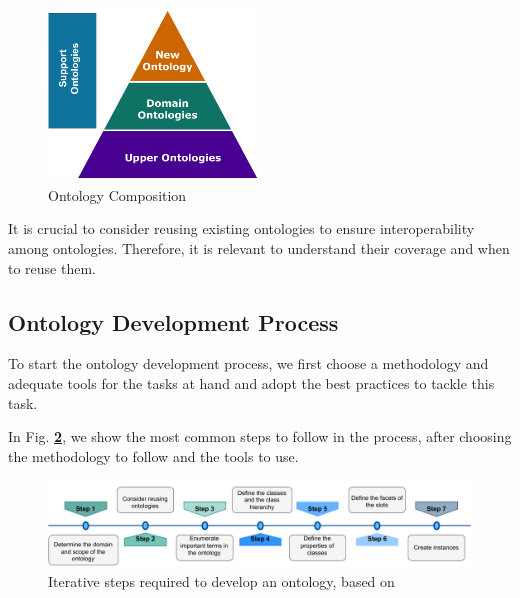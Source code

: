 \documentclass{guideline/sty/rapport}
\begin{document}
    \begin{figure}[H]
        \centering
          \includegraphics[width=0.5\textwidth]{images/OntologyComposition.pdf}
          \caption{Ontology Composition}
    \label{fig:ontologycomposition}
    \end{figure}

    
\begin{beware}[Remark]
It is crucial to consider reusing existing ontologies to ensure interoperability among ontologies. Therefore, it is relevant to understand their coverage and when to reuse them.
\end{beware}


\newpage
\subsection{Ontology Development Process}

To start the ontology development process, we first choose a methodology and adequate tools for the tasks at hand and adopt the best practices to tackle this task.\singlespacing

In Fig. \textbf{\ref{fig:stepsNoy}}, we show the most common steps to follow in the process, after choosing the methodology to follow and the tools to use.

    \begin{figure}[H]
        \centering
          \includegraphics[width=1\linewidth]{images/StepsNoy.pdf}
          \caption{Iterative steps required to develop an ontology, based on \cite{Noy01}}
        \label{fig:stepsNoy}
    \end{figure}
    
\end{document}
